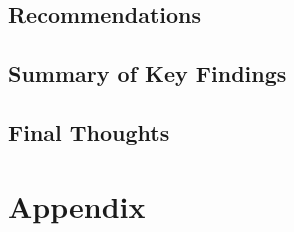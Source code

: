 \documentclass[
  11pt,
  letterpaper,
  DIV=11,
  numbers=noendperiod]{scrartcl}
\numberwithin{figure}{section}
\begin{document}
\hypertarget{recommendations}{%
\subsection{Recommendations}\label{recommendations}}

\hypertarget{summary-of-key-findings}{%
\subsection{Summary of Key Findings}\label{summary-of-key-findings}}

\hypertarget{final-thoughts}{%
\subsection{Final Thoughts}\label{final-thoughts}}

\hypertarget{appendix}{%
\section{Appendix}\label{appendix}}
\end{document}

